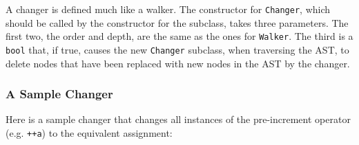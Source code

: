 \documentclass[10pt]{article}
\begin{document}
A changer is defined much like a walker.  The constructor for {\tt Changer}, 
which should be called by the constructor for the subclass, takes three 
parameters.  The first two, the order and depth, are the same as the ones 
for {\tt Walker}.  The third is a {\tt bool} that, if true, causes the new 
{\tt Changer} subclass, when traversing the AST, to delete nodes that have 
been replaced with new nodes in the AST by the changer.

\subsubsection{A Sample Changer}

Here is a sample changer that changes all instances of the pre-increment
operator (e.g. {\tt ++a}) to the equivalent assignment:
\end{document}

